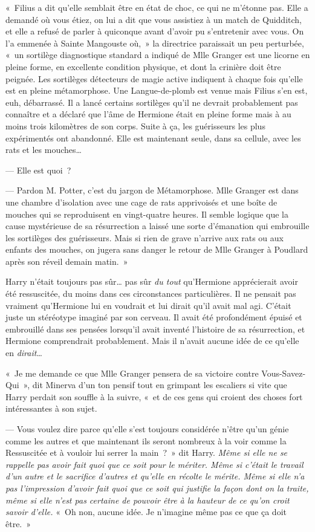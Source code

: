 «~Filius a dit qu'elle semblait être en état de choc, ce qui ne m'étonne pas. Elle a demandé où vous étiez, on lui a dit que vous assistiez à un match de Quidditch, et elle a refusé de parler à quiconque avant d'avoir pu s'entretenir avec vous. On l'a emmenée à Sainte Mangouste où,~» la directrice paraissait un peu perturbée, «~un sortilège diagnostique standard a indiqué de Mlle Granger est une licorne en pleine forme, en excellente condition physique, et dont la crinière doit être peignée. Les sortilèges détecteurs de magie active indiquent à chaque fois qu'elle est en pleine métamorphose. Une Langue-de-plomb est venue mais Filius s'en est, euh, débarrassé. Il a lancé certains sortilèges qu'il ne devrait probablement pas connaître et a déclaré que l'âme de Hermione était en pleine forme mais à au moins trois kilomètres de son corps. Suite à ça, les guérisseurs les plus expérimentés ont abandonné. Elle est maintenant seule, dans sa cellule, avec les rats et les mouches…

--- Elle est quoi~?

--- Pardon M. Potter, c'est du jargon de Métamorphose. Mlle Granger est dans une chambre d'isolation avec une cage de rats apprivoisés et une boîte de mouches qui se reproduisent en vingt-quatre heures. Il semble logique que la cause mystérieuse de sa résurrection a laissé une sorte d'émanation qui embrouille les sortilèges des guérisseurs. Mais si rien de grave n'arrive aux rats ou aux enfants des mouches, on jugera sans danger le retour de Mlle Granger à Poudlard après son réveil demain matin.~»

Harry n'était toujours pas sûr… pas sûr \emph{du tout} qu'Hermione apprécierait avoir été ressuscitée, du moins dans ces circonstances particulières. Il ne pensait pas vraiment qu'Hermione lui en voudrait et lui dirait qu'il avait mal agi. C'était juste un stéréotype imaginé par son cerveau. Il avait été profondément épuisé et embrouillé dans ses pensées lorsqu'il avait inventé l'histoire de sa résurrection, et Hermione comprendrait probablement. Mais il n'avait aucune idée de ce qu'elle en \emph{dirait}…

«~Je me demande ce que Mlle Granger pensera de sa victoire contre Vous-Savez-Qui~», dit Minerva d'un ton pensif tout en grimpant les escaliers si vite que Harry perdait son souffle à la suivre, «~et de ces gens qui croient des choses fort intéressantes à son sujet.

--- Vous voulez dire parce qu'elle s'est toujours considérée n'être qu'un génie comme les autres et que maintenant ils seront nombreux à la voir comme la Ressuscitée et à vouloir lui serrer la main~?~» dit Harry. \emph{Même si elle ne se rappelle pas avoir fait quoi que ce soit pour le mériter. Même si c'était le travail d'un autre et le sacrifice d'autres et qu'elle en récolte le mérite. Même si elle n'a pas l'impression d'avoir fait quoi que ce soit qui justifie la façon dont on la traite, même si elle n'est pas certaine de pouvoir être à la hauteur de ce qu'on croit savoir d'elle.} «~Oh non, aucune idée. Je n'imagine même pas ce que ça doit être.~»

